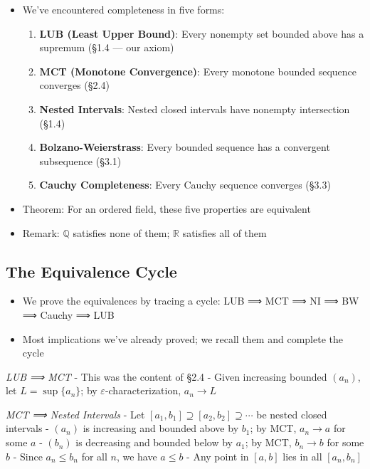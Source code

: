 \documentclass[
  10pt,
  letterpaper,
]{scrbook}
\providecommand{\tightlist}{%
  \setlength{\itemsep}{0pt}\setlength{\parskip}{0pt}}
\newcommand{\QQ}{\mathbb{Q}}
\newcommand{\RR}{\mathbb{R}}
\begin{document}
\begin{itemize}
\tightlist
\item
  We've encountered completeness in five forms:

  \begin{enumerate}
  \def\labelenumi{\arabic{enumi}.}
  \tightlist
  \item
    \textbf{LUB (Least Upper Bound)}: Every nonempty set bounded above
    has a supremum (§1.4 --- our axiom)
  \item
    \textbf{MCT (Monotone Convergence)}: Every monotone bounded sequence
    converges (§2.4)
  \item
    \textbf{Nested Intervals}: Nested closed intervals have nonempty
    intersection (§1.4)
  \item
    \textbf{Bolzano-Weierstrass}: Every bounded sequence has a
    convergent subsequence (§3.1)
  \item
    \textbf{Cauchy Completeness}: Every Cauchy sequence converges (§3.3)
  \end{enumerate}
\item
  Theorem: For an ordered field, these five properties are equivalent
\item
  Remark: \(\QQ\) satisfies none of them; \(\RR\) satisfies all of them
\end{itemize}

\subsection{The Equivalence Cycle}\label{the-equivalence-cycle}

\begin{itemize}
\tightlist
\item
  We prove the equivalences by tracing a cycle: LUB ⟹ MCT ⟹ NI ⟹ BW ⟹
  Cauchy ⟹ LUB
\item
  Most implications we've already proved; we recall them and complete
  the cycle
\end{itemize}

\emph{LUB ⟹ MCT} - This was the content of §2.4 - Given increasing
bounded \((a_n)\), let \(L = \sup\{a_n\}\); by
\(\varepsilon\)-characterization, \(a_n \to L\)

\emph{MCT ⟹ Nested Intervals} - Let
\([a_1, b_1] \supseteq [a_2, b_2] \supseteq \cdots\) be nested closed
intervals - \((a_n)\) is increasing and bounded above by \(b_1\); by
MCT, \(a_n \to a\) for some \(a\) - \((b_n)\) is decreasing and bounded
below by \(a_1\); by MCT, \(b_n \to b\) for some \(b\) - Since
\(a_n \leq b_n\) for all \(n\), we have \(a \leq b\) - Any point in
\([a, b]\) lies in all \([a_n, b_n]\)
\end{document}
